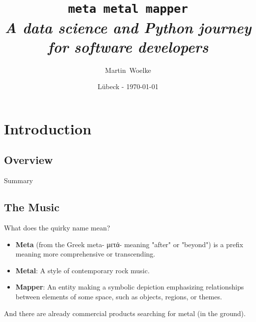 \documentclass{beamer}
\title[Titel]
{
  \texttt{\huge{meta metal mapper}}\\\vspace{3 mm}
  \textit{A data science and Python journey for software developers}
}
\author[Martin Woelke]
{
  Martin~Woelke
}
\date{Lübeck - \today}
\begin{document}
\begin{frame}
  \titlepage
\end{frame}


\section{Introduction}


  \subsection{Overview}

    \begin{frame}{Summary}
      \tableofcontents
    \end{frame}

  \subsection{The Music}

    \begin{frame}{What does the quirky name mean?}
      \begin{itemize}
        \item\textbf{Meta} (from the Greek meta- \foreignlanguage{greek}{μετά}- meaning
        "after" or "beyond") is a prefix meaning more comprehensive or transcending\footnotemark.\pause
        \item\textbf{Metal}: A style of contemporary rock  music.\pause
        \item\textbf{Mapper}: An entity making a symbolic depiction emphasizing relationships
        between elements of some space, such as objects, regions, or themes.\pause
      \end{itemize}
      
      \vspace{5mm}
      
      And there are already commercial products searching for metal (in the ground).
      
      
    \end{frame}
\end{document}

